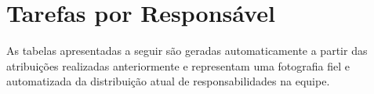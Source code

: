 \chapter{Tarefas por Responsável}

As tabelas apresentadas a seguir são geradas automaticamente a partir das atribuições realizadas anteriormente e representam uma fotografia fiel e automatizada da distribuição atual de responsabilidades na equipe.

\responsaveis